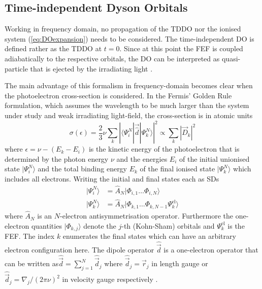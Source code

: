 \subsection{Time-independent Dyson Orbitals}
Working in frequency domain, no propagation of the TDDO nor the ionised system (\ref{eq:DOexpansion}) needs to be considered.
The time-independent DO is defined rather as the TDDO at $t=0$.
Since at this point the FEF is coupled adiabatically to the respective orbitals, the DO can be interpreted as quasi-particle that is ejected by the irradiating light \cite{ezDyson}.

The main advantage of this formalism in frequency-domain becomes clear when the photoelectron cross-section is considered.
In the Fermis' Golden Rule formulation, which assumes the wavelength to be much larger than the system under study and weak irradiating light-field, the cross-section is in atomic units \cite{richardsFD,MAgg}
\begin{equation} \label{eq:sigma}
\sigma(\epsilon) =\frac 23
           \nu \sum_k\left| \langle \Psi^N_i | \vec{\hat{d}} | \Psi^N_{k}\rangle
\right|^2  
             \propto \sum_k \left|  \vec{D}_k \right| ^2
\end{equation}
where $\epsilon=\nu-(E_k-E_i)$ is the kinetic energy of the photoelectron that is determined by the photon energy $\nu$ and the energies $E_i$ of the initial unionised state $|\Psi^N_i \rangle$ and the total binding energy $E_k$ of the final ionised state $|\Psi^N_k\rangle$ which includes all electrons.
Writing the initial and final states each as SDs
\begin{subequations} \label{eq:SDs} \begin{align}
   |\Psi^N_i\rangle &= \hat{A}_N | \Phi_{i,1} \hdots \Phi_{i,N} \rangle \\
   |\Psi^N_k \rangle &= \hat{A}_N | \Phi_{k,1}\hdots \Phi_{k,N-1} \Psi_k^\text{el} \rangle
\end{align}\end{subequations}
where $\hat{A}_N$ is an $N$-electron antisymmetrisation operator.
Furthermore the one-electron quantities $|\Phi_{k,j}\rangle$ denote the $j$-th (Kohn-Sham) orbitals and $\Psi_k^\text{el}$ is the FEF.
The index $k$ enumerates the final states which can have an arbitrary electron configuration here.
The dipole operator $\hat{\vec{d}}$ is a one-electron operator that can be written as$\hat{\vec{d}}=\sum_{j=1}^N \hat{\vec{d}}_j$ where $\hat{\vec{d}}_j=\vec{r}_j$ in length gauge or $\hat{\vec{d}}_j=\nabla_j/(2\pi\nu)^2$ in velocity gauge respectively \cite{richardsFD}.


